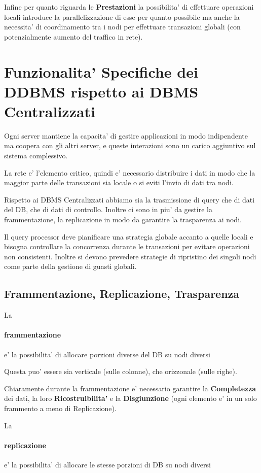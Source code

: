 Infine per quanto riguarda le \textbf{Prestazioni} la possibilita' di effettuare operazioni locali introduce la parallelizzazione di esse per quanto possibile ma anche la necessita' di coordinamento tra i nodi per effettuare transazioni globali (con potenzialmente aumento del traffico in rete).

\section{Funzionalita' Specifiche dei DDBMS rispetto ai DBMS Centralizzati}

Ogni server mantiene la capacita' di gestire applicazioni in modo indipendente ma coopera con gli altri server, e queste interazioni sono un carico aggiuntivo sul sistema complessivo.

La rete e' l'elemento critico, quindi e' necessario distribuire i dati in modo che la maggior parte delle transazioni sia locale o si eviti l'invio di dati tra nodi.

Rispetto ai DBMS Centralizzati abbiamo sia la trasmissione di query che di dati del DB, che di dati di controllo. Inoltre ci sono in piu' da gestire la frammentazione, la replicazione in modo da garantire la trasparenza ai nodi.

Il query processor deve pianificare una strategia globale accanto a quelle locali e bisogna controllare la concorrenza durante le transazioni per evitare operazioni non consistenti. Inoltre si devono prevedere strategie di ripristino dei singoli nodi come parte della gestione di guasti globali.

\subsection{Frammentazione, Replicazione, Trasparenza}

La \paragraph{frammentazione} e' la possibilita' di allocare porzioni diverse del DB su nodi diversi

Questa puo' essere sia verticale (sulle colonne), che orizzonale (sulle righe).

Chiaramente durante la frammentazione e' necessario garantire la \textbf{Completezza} dei dati, la loro \textbf{Ricostruibilita'} e la \textbf{Disgiunzione} (ogni elemento e' in un solo frammento a meno di Replicazione).

La \paragraph{replicazione} e' la possibilita' di allocare le stesse porzioni di DB su nodi diversi

